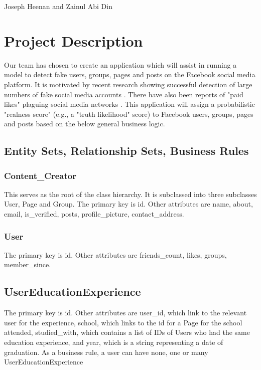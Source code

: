 \documentclass{article}
\begin{document}
\begin{center}
\begin{LARGE}{Joseph Heenan and Zainul Abi Din} \end{LARGE}
\end{center}

\section{Project Description}

Our team has chosen to create an application which will assist in running a model to detect fake users, groups, pages and posts on the Facebook social media platform. It is motivated by recent research showing successful detection of large numbers of fake social media accounts \cite{2017arXiv170102405E}. There have also been reports of "paid likes"  plaguing social media networks \cite{TheBotBubble}. This application will assign a probabilistic "realness score" (e.g., a "truth likelihood" score) to Facebook users, groups, pages and posts based on the below general business logic.

\subsection{Entity Sets, Relationship Sets, Business Rules}

\subsubsection{Content_Creator}
This serves as the root of the class hierarchy. It is subclassed into three subclasses User, Page and Group. The primary key is id. Other attributes are name, about, email, is_verified, posts, profile_picture, contact_address.

\subsubsection{User}

The primary key is id. Other attributes are friends_count, likes, groups, member_since.

\subsection{UserEducationExperience}

The primary key is id. Other attributes are user_id, which link to the relevant user for the experience, school, which links to the id for a Page for the school attended, studied_with, which contains a list of IDs of Users who had the same education experience, and year, which is a string representing a date of graduation. As a business rule, a user can have none, one or many UserEducationExperience
\end{document}
